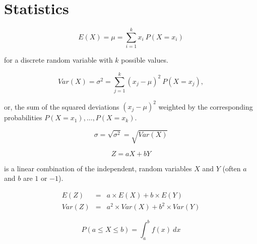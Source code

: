 \section{Statistics}


%
%


\begin{equation}
	E(X) = \mu = \sum_{i=1}^k x_i ~ P(X = x_i)
\end{equation}

for a discrete random variable with $k$ possible values.
\hformbar





\begin{equation}
	Var(X) = \sigma^2 = \sum_{j=1}^k (x_j - \mu)^2 ~ P(X = x_j),
\end{equation}

or, the sum of the squared deviations $(x_j - \mu)^2$ weighted by the corresponding probabilities $P(X=x_1),  \ldots, P(X=x_k)$.
\hformbar




\begin{equation}
	\sigma = \sqrt{\sigma^2} = \sqrt{Var(X)}
\end{equation}
\hformbar




\begin{equation}
	Z = aX + bY
\end{equation}

is a linear combination of the independent, random variables $X$ and $Y$ (often $a$ and $b$ are $1$ or $-1$). 

\begin{eqnarray}
  E(Z) &=& a \times E(X) + b \times E(Y) \\
  Var(Z) &=& a^2 \times Var(X) + b^2 \times Var(Y)
\end{eqnarray}
\hformbar




\begin{equation}
	P(a \leq X \leq b) = \int_{a}^{b} f(x) ~ dx
\end{equation}



